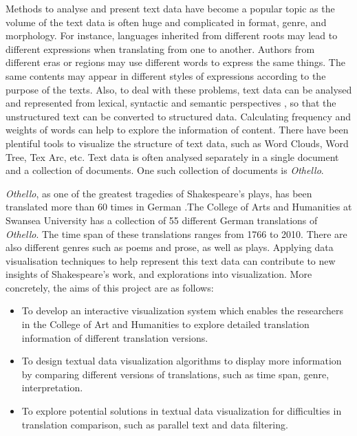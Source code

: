 Methods to analyse and present text data have become a popular topic as the volume of the text data is often huge and complicated in format, genre, and morphology. For instance, languages inherited from different roots may lead to different expressions when translating from one to another. Authors from different eras or regions may use different words to express the same things. The same contents may appear in different styles of expressions according to the purpose of the texts.
Also, to deal with these problems, text data can be analysed and represented from lexical, syntactic and semantic perspectives \cite{Ward2015}, so that the unstructured text can be converted to structured data. Calculating frequency and weights of words can help to explore the information of content. There have been plentiful tools to visualize the structure of text data, such as Word Clouds, Word Tree, Tex Arc,  etc. Text data is often analysed separately in a single document and a collection of documents. One such collection of documents is \emph{Othello}.

\emph{Othello}, as one of the greatest tragedies of Shakespeare's plays, has been translated more than 60 times in German  \cite{Geng2011}.The College of Arts and Humanities at Swansea University has a collection of 55 different German translations of \emph{Othello}. The time span of these translations ranges from 1766 to 2010. There are also different genres such as poems and prose, as well as plays. Applying data visualisation techniques to help represent this text data can contribute to new insights of Shakespeare’s work, and explorations into visualization. More concretely, the aims of this project are as follows:

\begin{itemize}
	\item \textbf{}To develop an interactive visualization system which enables the researchers in the College of Art and Humanities to explore detailed translation information of different translation versions.
	\item \textbf{} To design textual data visualization algorithms to display more information by comparing different versions of translations, such as time span, genre, interpretation.
	\item \textbf{} To explore potential solutions in textual data visualization for difficulties in translation comparison, such as parallel text and data filtering.
\end{itemize}

